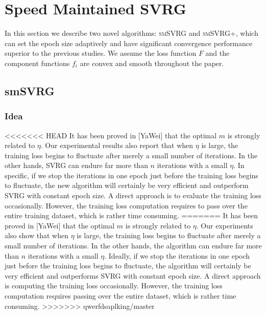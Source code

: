 \documentclass[conference]{IEEEtran}
\begin{document}
 \section{Speed Maintained SVRG}
 \label{mywork}
 In this section we describe two novel algorithms: \textsc{smSVRG} and \textsc{smSVRG+}, which can set the epoch size adaptively and have significant convergence performance superior to the previous studies.
 We assume the loss function $F$ and the component functions $f_i$ are convex and smooth throughout the paper.
 
 \subsection{smSVRG}
 \subsubsection{Idea}
<<<<<<< HEAD
 It has been proved in [YaWei] that the optimal $m$ is strongly related to $\eta$. Our experimental results also report that when $\eta$ is large, the training loss begins to fluctuate after merely a small number of iterations. In the other hands, SVRG can endure far more than $n$ iterations with a small $\eta$. In specific, if we stop the iterations in one epoch just before the training loss begins to fluctuate, the new algorithm will certainly be very efficient and outperform SVRG with constant epoch size. A direct approach is to evaluate the training loss occasionally. However, the training loss computation requires to pass over the entire training dataset, which is rather time consuming. 
=======
 It has been proved in [YaWei] that the optimal $m$ is strongly related to $\eta$. Our experiments also show that when $\eta$ is large, the training loss begins to fluctuate after merely a small number of iterations. In the other hands, the algorithm can endure far more than $n$ iterations with a small $\eta$. Ideally, if we stop the iterations in one epoch just before the training loss begins to fluctuate, the algorithm will certainly be very efficient and outperforms SVRG with constant epoch size. A direct approach is computing the training loss occasionally. However, the training loss computation requires passing over the entire dataset, which is rather time consuming. 
>>>>>>> qwerfdsaplking/master
\end{document}
